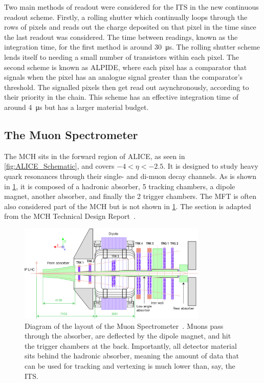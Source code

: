 Two main methods of readout were considered for the ITS in the new continuous readout scheme. Firstly, a rolling shutter which continually loops through the rows of pixels and reads out the charge deposited on that pixel in the time since the last readout was considered. The time between readings, known as the integration time, for the first method is around \SI{30}{\micro\second}. The rolling shutter scheme lends itself to needing a small number of transistors within each pixel. The second scheme is known as ALPIDE, where each pixel has a comparator that signals when the pixel has an analogue signal greater than the comparator's threshold. The signalled pixels then get read out asynchronously, according to their priority in the chain. This scheme has an effective integration time of around \SI{4}{\micro\second} but has a larger material budget. 


\subsection{The Muon Spectrometer}
The MCH sits in the forward region of ALICE, as seen in \cref{fig:ALICE_Schematic}, and covers $-4<\eta<-2.5$. It is designed to study heavy quark resonances through their single- and di-muon decay channels. As is shown in \cref{fig:Muon Spectrometer}, it is composed of a hadronic absorber, 5 tracking chambers, a dipole magnet, another absorber, and finally the 2 trigger chambers. The MFT is often also considered part of the MCH but is not shown in \cref{fig:Muon Spectrometer}. The section is adapted from the MCH Technical Design Report~\cite{MCH_TDR}.

\begin{figure}[ht]
    \begin{center}
        \includegraphics[width=0.8\textwidth]{Figs/MCH_schematic_pog.png}
        \caption{Diagram of the layout of the Muon Spectrometer~\cite{Muon_Spec_Schematic}. Muons pass through the absorber, are deflected by the dipole magnet, and hit the trigger chambers at the back. Importantly, all detector material sits behind the hadronic absorber, meaning the amount of data that can be used for tracking and vertexing is much lower than, say, the ITS.}
        \label{fig:Muon Spectrometer}
    \end{center}
\end{figure}

